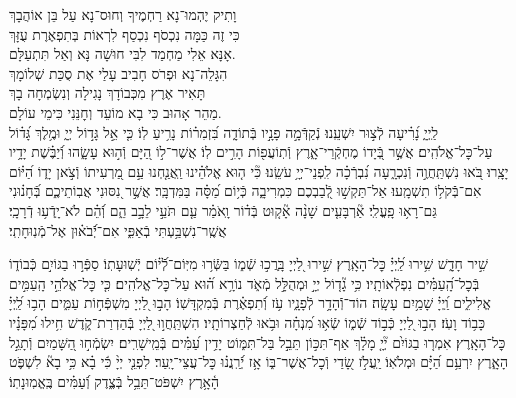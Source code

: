 \documentclass[twoside, openany, parskip=half, 11pt]{book}
\begin{document}
	
	וָתִיק יֶהְמוּ־נָא רַחְמֶיךָ וְחוּס־נָא עַל בֵּן אוֹהֲבָךְ\\
	כִּי זֶה כַּמָּה נִכְסֹף נִכְסַף לִרְאוֹת בְּתִפְאֶרֶת עֻזָּךְ\\
	אָנָּא אֵלִי מַחְמַד לִבִּי חוּשָׁה נָּא וְאַל תִּתְעַלָּם.\\
	
	הִגָּלֵה־נָא וּפְרֹס חָבִיב	עָלַי אֶת סֻכַּת שְׁלוֹמָךְ\\
	תָּאִיר אֶרֶץ מִכְּבוֹדָךְ נָגִילָה וְנִשְׂמְחָה בָךְ\\
	מַהֵר אָהוּב כִּי בָא מוֹעֵד וְחׇנֵּנִי כִּימֵי עוֹלָם.\\
	
 לַֽיְיָ֑ נָ֝רִ֗יעָה לְֿצ֣וּר יִשְׁעֵֽנוּ׃
 נְֿקַדְּֿמָ֣ה פָנָ֣יו בְּֿתוֹדָ֑ה בִּ֝זְמִר֗וֹת נָרִ֥יעַ לֽוֹ׃
 כִּ֤י אֵ֣ל גָּד֣וֹל יְיָ֑ וּמֶ֥לֶךְ גָּ֝ד֗וֹל עַל־כׇּל־אֱלֹהִֽים׃
 אֲשֶׁ֣ר בְּֿ֭יָדוֹ מֶחְקְֿרֵי־אָ֑רֶץ וְֿתֽוֹעֲפ֖וֹת הָרִ֣ים לֽוֹ׃
 אֲשֶׁר־ל֣וֹ הַ֭יָּם וְֿה֣וּא עָשָׂ֑הוּ וְֿ֝יַבֶּ֗שֶׁת יָדָ֥יו יָצָֽרוּ׃
 בֹּ֭אוּ נִשְׁתַּֽחֲוֶ֣ה וְֿנִכְרָ֑עָה נִ֝בְרְֿכָ֗ה לִֽפְנֵי־יְיָ֥ עֹשֵֽׂנוּ׃
 כִּ֘י ה֤וּא אֱלֹהֵ֗ינוּ וַֽאֲנַ֤חְנוּ עַ֣ם מַ֭רְעִיתוֹ וְֿצֹ֣אן יָד֑וֹ הַ֝יּ֗וֹם אִם־בְּֿֿקֹל֥וֹ תִשְׁמָֽעוּ׃
 אַל־תַּקְשׁ֣וּ לְֿ֭בַבְכֶם כִּמְרִיבָ֑ה כְּֿי֥וֹם מַ֝סָּ֗ה בַּמִּדְבָּֽר׃
 אֲשֶׁ֣ר נִ֭סּוּנִי אֲבֽוֹתֵיכֶ֑ם בְּֿ֝חָנ֗וּנִי גַּם־רָא֥וּ פָֽעֳלִֽי׃
 אַ֘רְבָּעִ֤ים שָׁנָ֨ה אָ֘ק֤וּט בְּֿד֗וֹר וָֽאֹמַ֗ר עַ֤ם תֹּעֵ֣י לֵבָ֣ב הֵ֑ם וְֿ֝הֵ֗ם לֹא־יָֽדְֿע֥וּ דְֿרָכָֽי׃
 אֲשֶֽׁר־נִשְׁבַּ֥עְתִּי בְֿאַפִּ֑י אִם־יְֿֿ֝בֹא֗וּן אֶל־מְֿנֽוּחָתִֽי׃


 שִׁ֣יר חָדָ֑שׁ שִׁ֥ירוּ לַֽ֝יְיָ֗ כׇּל־הָאָֽרֶץ׃
 שִׁ֣ירוּ לַ֭יְיָ בָּֽרֲכ֣וּ שְֿׁמ֑וֹ בַּשְּֿׂר֥וּ מִיּֽוֹם־לְֿֿ֝י֗וֹם יְֿשֽׁוּעָתֽוֹ׃
 סַפְּֿר֣וּ בַגּוֹיִ֣ם כְּֿבוֹד֑וֹ בְּֿכׇל־הָֽ֝עַמִּ֗ים נִפְלְֿאוֹתָֽיו׃
 כִּ֥י גָ֘ד֤וֹל יְיָ֣ וּמְהֻלָּ֣ל מְֿאֹ֑ד נוֹרָ֥א ה֝֗וּא עַל־כׇּל־אֱלֹהִֽים׃
 כִּ֤י כׇּל־אֱלֹהֵ֣י הָֽעַמִּ֣ים אֱלִילִ֑ים וַֽ֝יְיָ֗ שָׁמַ֥יִם עָשָֽׂה׃
 הוֹד־וְֿֿהָדָ֥ר לְֿפָנָ֑יו עֹ֥ז וְֿ֝תִפְאֶ֗רֶת בְּֿמִקְדָּשֽׁוֹ׃
 הָב֣וּ לַ֭יְיָ מִשְׁפְּֿח֣וֹת עַמִּ֑ים הָב֥וּ לַֽ֝יְיָ֗ כָּב֥וֹד וָעֹֽז׃
 הָב֣וּ לַ֭יְיָ כְּֿב֣וֹד שְֿׁמ֑וֹ שְֿׂא֥וּ מִ֝נְחָ֗ה וּבֹ֥אוּ לְֿחַצְרוֹתָֽיו׃
 הִשְׁתַּֽחֲו֣וּ לַ֭יְיָ בְּֿהַדְרַת־קֹ֑דֶשׁ חִ֥ילוּ מִ֝פָּנָ֗יו כׇּל־הָאָֽרֶץ׃
 אִמְר֤וּ בַגּוֹיִ֨ם יְ֘יָ֤ מָלָ֗ךְ אַף־תִּכּ֣וֹן תֵּבֵ֣ל בַּל־תִּמּ֑וֹט יָדִ֥ין עַ֝מִּ֗ים בְּֿמֵֽישָׁרִֽים׃
 יִשְׂמְֿח֣וּ הַ֭שָּׁמַיִם וְֿתָגֵ֣ל הָאָ֑רֶץ יִרְעַ֥ם הַ֝יָּ֗ם וּמְלֹאֽוֹ׃
 יַֽעֲלֹ֣ז שָׂ֭דַי וְֿכׇל־אֲשֶׁר־בּ֑וֹ אָ֥ז יְֿ֝רַֽנֲנ֗וּ כׇּל־עֲצֵי־יָֽעַר׃
 לִפְנֵ֤י יְיָ֨ כִּ֬י בָ֗א כִּ֥י בָא֘ לִשְׁפֹּ֢ט הָ֫אָ֥רֶץ יִשְׁפֹּט־תֵּבֵ֥ל בְּֿצֶ֑דֶק וְֿ֝עַמִּ֗ים בֶּֽאֱמֽוּנָתֽוֹ׃
\end{document}
